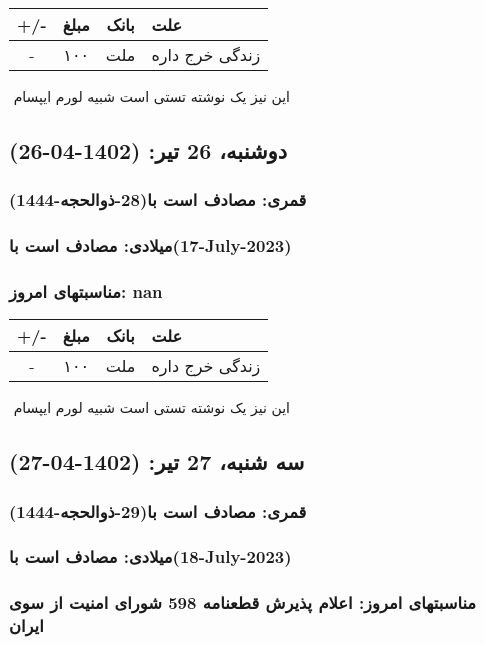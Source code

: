 \documentclass{article}
\newcommand{\rnote}[1]{\marginpar{\textcolor{color}{\StrSubstitute{\##1}{ }{\_}}}}
\newcommand{\myRow}[4]{
    #1 & #2 & #3 & #4 \\ \hline
}
\begin{document}
\begin{tabular}{ | c | c | c | p{5cm} |}
    \hline
    \myRow{ +/- }{مبلغ}{بانک}{علت}
    \myRow{-}{۱۰۰}{ملت}{زندگی خرج داره}
\end{tabular}
\newline
\newline

‌
\rnote{تست}
این نیز یک نوشته تستی است شبیه لورم ایپسام




\newpage
{}
\textcolor{color}{
\section{ دوشنبه، 26 تیر: (1402-04-26) }
\subsubsection*{قمری: مصادف است با(28-ذوالحجه-1444)} 
\subsubsection*{میلادی: مصادف است با(17-July-2023)}
\subsubsection*{مناسبتهای امروز: nan}
}


\begin{tabular}{ | c | c | c | p{5cm} |}
    \hline
    \myRow{ +/- }{مبلغ}{بانک}{علت}
    \myRow{-}{۱۰۰}{ملت}{زندگی خرج داره}
\end{tabular}
\newline
\newline

‌
\rnote{تست}
این نیز یک نوشته تستی است شبیه لورم ایپسام




\newpage
{}
\textcolor{color}{
\section{ سه شنبه، 27 تیر: (1402-04-27) }
\subsubsection*{قمری: مصادف است با(29-ذوالحجه-1444)} 
\subsubsection*{میلادی: مصادف است با(18-July-2023)}
\subsubsection*{مناسبتهای امروز: اعلام پذیرش قطعنامه 598 شورای امنیت از سوی ایران}
}
\end{document}
